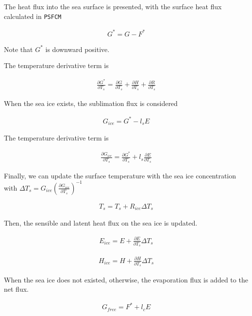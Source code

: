 The heat flux into the sea surface is presented, with the surface heat
flux calculated in \texttt{PSFCM}

\begin{eqnarray}
    G^* = G - F^*
\end{eqnarray}

Note that \(G^*\) is downward positive.

The temperature derivative term is

\begin{eqnarray}
    \frac{\partial G^*}{\partial T_s} = \frac{\partial G}{\partial T_s}+\frac{\partial H}{\partial T_s}+\frac{\partial R}{\partial T_s}
\end{eqnarray}

When the sea ice exists, the sublimation flux is considered

\begin{eqnarray}
    G_{ice} = G^* - l_s E
\end{eqnarray}

The temperature derivative term is

\begin{eqnarray}
    \frac{\partial G_{ice}}{\partial T_s}=\frac{\partial G^*}{\partial T_s} + l_s\frac{\partial E}{\partial T_s}
\end{eqnarray}

Finally, we can update the surface temperature with the sea ice
concentration with
\(\Delta T_s=G_{ice} ( \frac{\partial G_{ice}}{\partial T_s})^{-1}\)

\begin{eqnarray}
    T_s = T_s +R_{ice} \Delta T_s
\end{eqnarray}

Then, the sensible and latent heat flux on the sea ice is updated.

\begin{eqnarray}
    E_{ice} = E + \frac{\partial E}{\partial T_s}\Delta T_s
\end{eqnarray}

\begin{eqnarray}
    H_{ice} = H + \frac{\partial H}{\partial T_s}\Delta T_s
\end{eqnarray}

When the sea ice does not existed, otherwise, the evaporation flux is
added to the net flux.

\begin{eqnarray}
    G_{free}=F^* + l_cE
\end{eqnarray}


